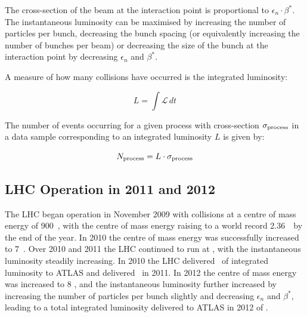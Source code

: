 The cross-section of the beam at
the interaction point is proportional to ${\epsilon_{n} \cdot \beta^{*}}$.
The instantaneous luminosity can be maximised by increasing the
number of particles per bunch, decreasing the bunch spacing (or equivalently
increasing the number of bunches per beam) or decreasing the size of the bunch
at the interaction point by decreasing $\epsilon_{n}$ and $\beta^{*}$.

A measure of how many collisions have occurred is the integrated luminosity:

\begin{equation}
L = \int \mathcal{L} \, dt
\end{equation}

The number of events occurring for a given process with cross-section
$\sigma_{\rm{process}}$ in a data sample corresponding to an integrated
luminosity $L$ is given by:

\begin{equation}
N_{\rm{process}} = L \cdot \sigma_{\rm{process}}
\end{equation}

\subsection{LHC Operation in 2011 and 2012}
\label{sec-lhc-operation}

The LHC began operation in November 2009 with collisions at a centre of mass
energy of 900~\GeV, with the centre of mass energy raising to a world record
2.36~\TeV\ by the end of the year. In 2010 the centre of mass energy was
successfully increased to 7~\TeV. Over 2010 and 2011 the LHC continued to run at
, with the instantaneous luminosity steadily increasing. In 2010 the
LHC delivered \LumiTotalDeliveredTwentyTen\ of integrated luminosity to ATLAS
and delivered \LumiTotalDeliveredTwentyEleven\ in 2011. In 2012 the centre of mass energy was
increased to 8 \tev, and the instantaneous luminosity further increased by
increasing the number of particles per bunch slightly and decreasing
$\epsilon_{n}$ and $\beta^{*}$, leading to a total integrated luminosity
delivered to ATLAS in 2012 of \LumiTotalDeliveredTwentyTwelve. 

